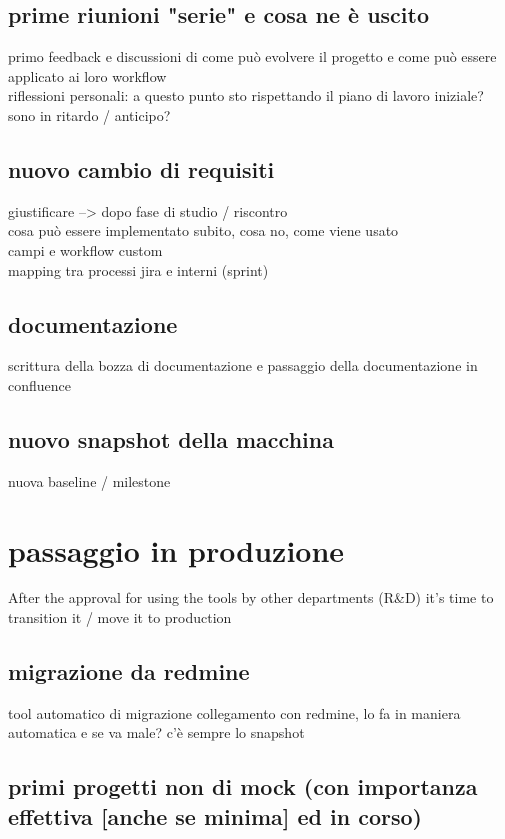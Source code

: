 	\subsection{prime riunioni "serie" e cosa ne è uscito}
		primo feedback e discussioni di come può evolvere il progetto e come può essere applicato ai loro workflow\\
		riflessioni personali: a questo punto sto rispettando il piano di lavoro iniziale? sono in ritardo / anticipo?
	
	\subsection{nuovo cambio di requisiti}
		giustificare --> dopo fase di studio / riscontro\\
		cosa può essere implementato subito, cosa no, come viene usato\\
		campi e workflow custom\\
		mapping tra processi jira e interni (sprint)
	
	\subsection{documentazione}
		scrittura della bozza di documentazione e passaggio della documentazione in confluence
		
	\subsection{nuovo snapshot della macchina}
		nuova baseline / milestone

\section{passaggio in produzione}

	After the approval for using the tools by other departments (R\&D) it's time to transition it / move it to production
	
	\subsection{migrazione da redmine}
		tool automatico di migrazione
		collegamento con redmine, lo fa in maniera automatica
		e se va male? c'è sempre lo snapshot
	
	\subsection{primi progetti non di mock (con importanza effettiva [anche se minima] ed in corso)}
	
